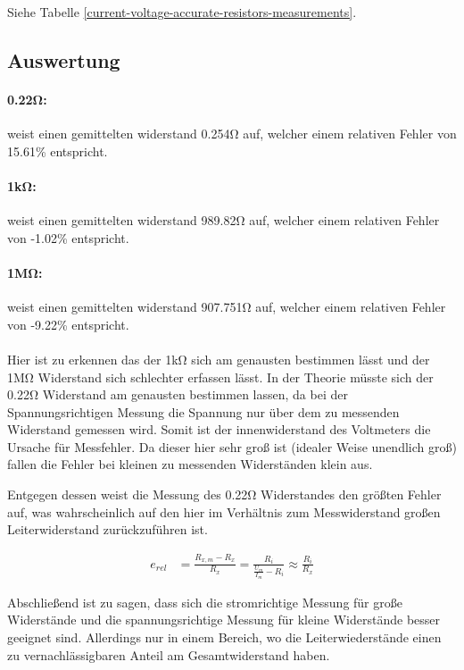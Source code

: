 \documentclass[a4paper, 11pt]{report}
\begin{document}
Siehe Tabelle \ref{current-voltage-accurate-resistors-measurements}.

\subsection{Auswertung}

\paragraph{0.22\si{\ohm}:}
weist einen gemittelten widerstand 0.254\si{\ohm} auf, welcher einem relativen Fehler von 15.61\% entspricht.

\paragraph{1\si{\kilo\ohm}:}
weist einen gemittelten widerstand 989.82\si{\ohm} auf, welcher einem relativen Fehler von -1.02\% entspricht.

\paragraph{1\si{\mega\ohm}:}
weist einen gemittelten widerstand 907.751\si{\ohm} auf, welcher einem relativen Fehler von -9.22\% entspricht.

\paragraph{}
Hier ist zu erkennen das der 1\si{\kilo\ohm} sich am genausten bestimmen lässt und der 1\si{\mega\ohm} Widerstand sich schlechter erfassen lässt. In der Theorie müsste sich der 0.22\si{\ohm} Widerstand am genausten bestimmen lassen, da bei der Spannungsrichtigen Messung die Spannung nur über dem zu messenden Widerstand gemessen wird. Somit ist der innenwiderstand des Voltmeters die Ursache für Messfehler. Da dieser hier sehr groß ist (idealer Weise unendlich groß) fallen die Fehler bei kleinen zu messenden Widerständen klein aus.

Entgegen dessen weist die Messung des 0.22\si{\ohm} Widerstandes den größten Fehler auf, was wahrscheinlich auf den hier im Verhältnis zum Messwiderstand großen Leiterwiderstand zurückzuführen ist.

\begin{align}
    e_{rel} &= \frac{R_{x,m} - R_x}{R_x} = \frac{R_i}{\frac{U_m}{I_m} - R_i} \approx \frac{R_i}{R_x}
\end{align}

Abschließend ist zu sagen, dass sich die stromrichtige Messung für große Widerstände und die spannungsrichtige Messung für kleine Widerstände besser geeignet sind. Allerdings nur in einem Bereich, wo die Leiterwiederstände einen zu vernachlässigbaren Anteil am Gesamtwiderstand haben.
\end{document}
